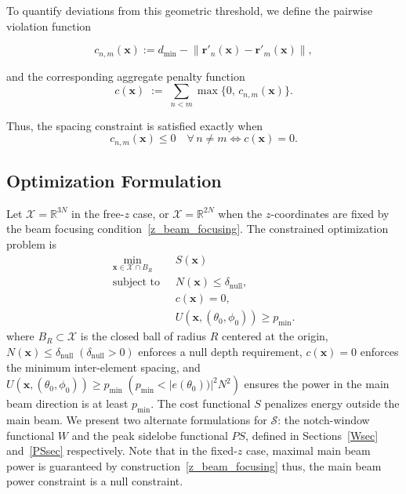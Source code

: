 \documentclass[11pt,letterpaper]{article}
\theoremstyle{definition}
\theoremstyle{plain}
\begin{document}
To quantify deviations from this geometric threshold, we define the pairwise violation function

\[
c_{n,m}(\mathbf{x}) := d_{\min} - \big\|\mathbf{r}'_n(\mathbf{x})-\mathbf{r}'_m(\mathbf{x})\big\|,
\]

and the corresponding aggregate penalty function
\[
c(\mathbf{x}) \;:=\; \sum_{n<m} \max\{0,\,c_{n,m}(\mathbf{x})\}.
\]

Thus, the spacing constraint is satisfied exactly when
\[
c_{n,m}(\mathbf{x})\leq 0 \quad \forall\, n \neq m \iff c(\mathbf{x})= 0.
\]




\subsection{Optimization Formulation}

Let $\mathcal{X} = \mathbb{R}^{3N}$ in the free-$z$ case, or $\mathcal{X} = \mathbb{R}^{2N}$ when the
$z$-coordinates are fixed by the beam focusing condition~\eqref{z_beam_focusing}. The constrained
optimization problem is
\begin{equation}
\begin{aligned}
\min_{\mathbf{x}\in\mathcal{X}\cap B_R} \;& S(\mathbf{x}) \\[4pt]
\text{subject to }\;& N(\mathbf{x})\leq \delta_{\mathrm{null}},\\
                    & c(\mathbf{x}) = 0,\\
                    & U(\mathbf x, (\theta_0,\phi_0)) \geq p_{\mathrm{min}}.
\end{aligned}
\label{OptProblem}
\end{equation}
where $B_R \subset \mathcal{X}$ is the closed ball of radius $R$ centered at the origin, $N(\mathbf{x})\leq \delta_{\mathrm{null}}  \;(\delta_{\mathrm{null}}>0)$ enforces a null depth
requirement, $c(\mathbf{x}) = 0$ enforces the minimum inter-element spacing, and $U(\mathbf x, (\theta_0,\phi_0)) \geq p_{\mathrm{min}} \; (p_{\mathrm{min}}< |e(\theta_0))|^2 N^2)$ ensures the power in the main beam direction is at least $p_{\mathrm{min}}$. The cost functional
$S$ penalizes energy outside the main beam. We present two alternate formulations for $\mathcal{S}$: the notch-window functional $W$
and the peak sidelobe functional $PS$, defined in Sections~\ref{Wsec} and~\ref{PSsec}
respectively. Note that in the fixed-$z$ case, maximal main beam power is guaranteed by
construction~\eqref{z_beam_focusing} thus, the main beam power constraint is a null constraint.
\end{document}
